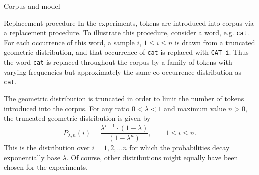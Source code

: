 \documentclass{article} %
\newcommand{\word}[1]{\texttt{#1}}
\begin{document}
\begin{section}{Corpus and model}
\begin{subsection}{Replacement procedure}\label{replacement-procedure}
In the experiments, tokens are introduced into corpus via a replacement procedure.
To illustrate this procedure, consider a word, e.g. \word{cat}.
For each occurrence of this word, a sample $i$, $1 \leqslant i \leqslant n$ is drawn from a truncated geometric distribution, and that occurrence of \word{cat} is replaced with \word{CAT\_i}.
Thus the word \word{cat} is replaced throughout the corpus by a family of tokens with varying frequencies but approximately the same co-occurrence distribution as \word{cat}.

The geometric distribution is truncated in order to limit the number of tokens introduced into the corpus.
For any ratio $0 < \lambda < 1$ and maximum value $n > 0$, the truncated geometric distribution is given by
$$ P_{\lambda, n} (i) = \frac{\lambda^{i-1} \cdot (1-\lambda)}{(1 - \lambda^n)}, \qquad 1 \leqslant i \leqslant n.$$ 
This is the distribution over $i = 1, 2, \dots n$ for which the probabilities decay exponentially base $\lambda$.
Of course, other distributions might equally have been chosen for the experiments.
\end{subsection}
\end{section}
\end{document}
